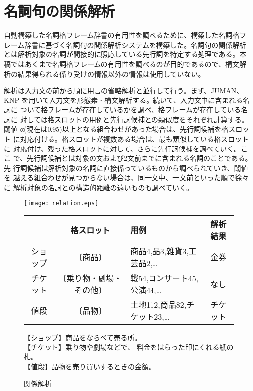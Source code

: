 \documentclass{nlp}
\begin{document}
 \section{名詞句の関係解析}
 
 自動構築した名詞格フレーム辞書の有用性を調べるために、構築した名詞格フ
 レーム辞書に基づく名詞句の関係解析システムを構築した。名詞句の関係解析
 とは解析対象の名詞が間接的に照応している先行詞を特定する処理である。本
 稿ではあくまで名詞格フレームの有用性を調べるのが目的であるので、構文解
 析の結果得られる係り受けの情報以外の情報は使用していない。

 解析は入力文の前から順に用言の省略解析と並行して行う。まず、JUMAN、KNP
 を用いて入力文を形態素・構文解析する。続いて、入力文中に含まれる名詞に
 ついて格フレームが存在しているかを調べ、格フレームが存在している名詞に
 対しては格スロットの用例と先行詞候補との類似度をそれぞれ計算する。閾値
 α(現在は0.95)以上となる組合わせがあった場合は、先行詞候補を格スロット
 に対応付ける。格スロットが複数ある場合は、最も類似している格スロットに
 対応付け、残った格スロットに対して、さらに先行詞候補を調べていく。ここ
 で、先行詞候補とは対象の文および2文前までに含まれる名詞のことである。先
 行詞候補は解析対象の名詞に直接係っているものから調べられていき、閾値を
 越える組合わせが見つからない場合は、同一文中、一文前といった順で徐々に
 解析対象の名詞との構造的距離の遠いものも調べていく。
  
  \begin{figure}[t]
   \begin{center}
    \texttt{[image: relation.eps]}    
    \vspace{1ex}
    \small{
    \begin{tabular}
     {c|c|l||c}
     \hline
     & 格スロット & 用例 & 解析結果\\\hline\hline
     ショップ & 〔商品〕 & 商品4,品3,雑貨3,工芸品2,… & 金券 \\\hline
     チケット & 〔乗り物・劇場・その他〕\footnotemark[3]
     & 戦54,コンサート45,公演44,… & なし\\\hline
     値段 & 〔品物〕 &  土地112,商品82,チケット23,… 
     & チケット\\\hline 
    \end{tabular}
    }
   \end{center}
   \footnotesize{
   \hspace{11em}【ショップ】商品をならべて売る所。\\
   \hspace{11em}【チケット】乗り物や劇場などで、
   料金をはらった印にくれる紙の札。\\
   \hspace{11em}【値段】品物を売り買いするときの金額。\\
   }
   \vspace{-2ex}
   \caption{関係解析}
   \label{analysis}
  \end{figure}
  
\end{document}
